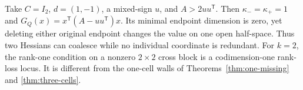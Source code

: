 \begin{example}\label{ex:coalescence}
Take $C=I_2$, $d=(1,-1)$, a mixed-sign $u$, and $A>2uu^{\mathsf T}$.
Then $\kappa_- =\kappa_+=1$ and $G_Q(x)=x^{\mathsf T}(A-uu^{\mathsf T})x$.
Its minimal endpoint dimension is zero, yet deleting either original
endpoint changes the value on one open half-space. Thus two Hessians can
coalesce while no individual coordinate is redundant. For $k=2$, the
rank-one condition on a nonzero $2\times2$ cross block is a codimension-one
rank-loss locus. It is different from the one-cell walls of
Theorems~\ref{thm:one-missing} and \ref{thm:three-cells}.
\end{example}
